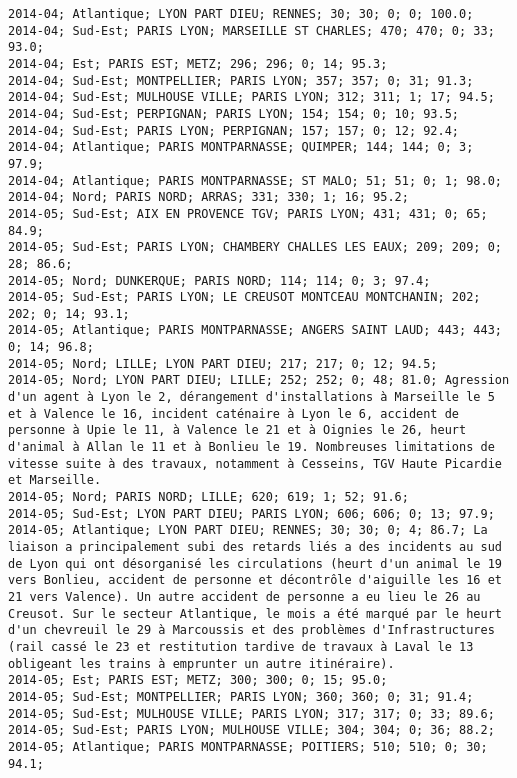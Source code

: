 \documentclass{article}
\begin{document}
\begin{Verbatim}[commandchars=\\\{\}]
2014-04; Atlantique; LYON PART DIEU; RENNES; 30; 30; 0; 0; 100.0; 
2014-04; Sud-Est; PARIS LYON; MARSEILLE ST CHARLES; 470; 470; 0; 33; 93.0; 
2014-04; Est; PARIS EST; METZ; 296; 296; 0; 14; 95.3; 
2014-04; Sud-Est; MONTPELLIER; PARIS LYON; 357; 357; 0; 31; 91.3; 
2014-04; Sud-Est; MULHOUSE VILLE; PARIS LYON; 312; 311; 1; 17; 94.5; 
2014-04; Sud-Est; PERPIGNAN; PARIS LYON; 154; 154; 0; 10; 93.5; 
2014-04; Sud-Est; PARIS LYON; PERPIGNAN; 157; 157; 0; 12; 92.4; 
2014-04; Atlantique; PARIS MONTPARNASSE; QUIMPER; 144; 144; 0; 3; 97.9; 
2014-04; Atlantique; PARIS MONTPARNASSE; ST MALO; 51; 51; 0; 1; 98.0; 
2014-04; Nord; PARIS NORD; ARRAS; 331; 330; 1; 16; 95.2; 
2014-05; Sud-Est; AIX EN PROVENCE TGV; PARIS LYON; 431; 431; 0; 65; 84.9; 
2014-05; Sud-Est; PARIS LYON; CHAMBERY CHALLES LES EAUX; 209; 209; 0; 28; 86.6; 
2014-05; Nord; DUNKERQUE; PARIS NORD; 114; 114; 0; 3; 97.4; 
2014-05; Sud-Est; PARIS LYON; LE CREUSOT MONTCEAU MONTCHANIN; 202; 202; 0; 14; 93.1; 
2014-05; Atlantique; PARIS MONTPARNASSE; ANGERS SAINT LAUD; 443; 443; 0; 14; 96.8; 
2014-05; Nord; LILLE; LYON PART DIEU; 217; 217; 0; 12; 94.5; 
2014-05; Nord; LYON PART DIEU; LILLE; 252; 252; 0; 48; 81.0; Agression d'un agent à Lyon le 2, dérangement d'installations à Marseille le 5 et à Valence le 16, incident caténaire à Lyon le 6, accident de personne à Upie le 11, à Valence le 21 et à Oignies le 26, heurt d'animal à Allan le 11 et à Bonlieu le 19. Nombreuses limitations de vitesse suite à des travaux, notamment à Cesseins, TGV Haute Picardie et Marseille.
2014-05; Nord; PARIS NORD; LILLE; 620; 619; 1; 52; 91.6; 
2014-05; Sud-Est; LYON PART DIEU; PARIS LYON; 606; 606; 0; 13; 97.9; 
2014-05; Atlantique; LYON PART DIEU; RENNES; 30; 30; 0; 4; 86.7; La liaison a principalement subi des retards liés a des incidents au sud de Lyon qui ont désorganisé les circulations (heurt d'un animal le 19 vers Bonlieu, accident de personne et décontrôle d'aiguille les 16 et 21 vers Valence). Un autre accident de personne a eu lieu le 26 au Creusot. Sur le secteur Atlantique, le mois a été marqué par le heurt d'un chevreuil le 29 à Marcoussis et des problèmes d'Infrastructures (rail cassé le 23 et restitution tardive de travaux à Laval le 13 obligeant les trains à emprunter un autre itinéraire).
2014-05; Est; PARIS EST; METZ; 300; 300; 0; 15; 95.0; 
2014-05; Sud-Est; MONTPELLIER; PARIS LYON; 360; 360; 0; 31; 91.4; 
2014-05; Sud-Est; MULHOUSE VILLE; PARIS LYON; 317; 317; 0; 33; 89.6; 
2014-05; Sud-Est; PARIS LYON; MULHOUSE VILLE; 304; 304; 0; 36; 88.2; 
2014-05; Atlantique; PARIS MONTPARNASSE; POITIERS; 510; 510; 0; 30; 94.1; 

\end{Verbatim}
\end{document}
